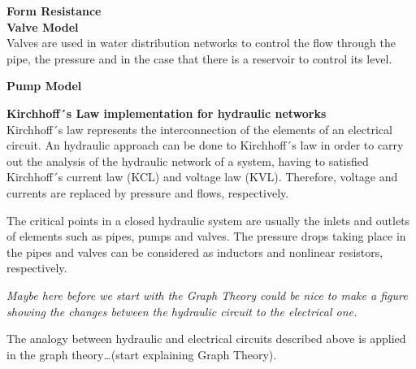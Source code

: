 \textbf{Form Resistance} \\ 

\textbf{Valve Model}  \\
\label{ValveModel}
 Valves are used in water distribution networks to control the flow through the pipe, the pressure and in 
 the case that there is a reservoir to control its level. 
 
 \textbf{Pump Model} \\
 \label{PumpModel}
 
 \textbf{Kirchhoff´s Law implementation for hydraulic networks}\\
 \label{KirchhoffLaw}
 Kirchhoff´s law represents the interconnection of the elements of an electrical circuit. An hydraulic approach 
 can be done to Kirchhoff´s law in order to carry out the analysis of the hydraulic network of a system, having to satisfied Kirchhoff´s 
 current law (KCL) and voltage law (KVL). Therefore, voltage and currents are replaced by pressure and flows, respectively. 

The critical points in a closed hydraulic system are usually the inlets and outlets of elements such as pipes, pumps and valves. 
The pressure drops taking place in the pipes and valves can be considered as inductors and nonlinear resistors, respectively. 

\textit{Maybe here before we start with the Graph Theory could be nice to make a figure showing the changes between the hydraulic circuit to the electrical 
one.}

The analogy between hydraulic and electrical circuits described above is applied in the graph theory…(start explaining Graph Theory).







